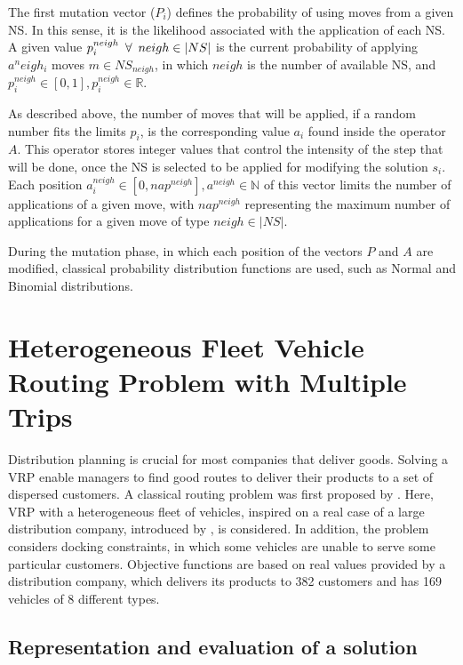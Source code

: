 \documentclass{endm}
\begin{document}
The first mutation vector ($P_i$) defines the probability of using moves from a given NS.
In this sense, it is the likelihood associated with the application of each NS.
A given value $p^{neigh}_i \enskip \forall \enskip neigh \in |NS|$ is the current probability of applying $a^neigh_i$ moves $m \in NS_{neigh}$, in which $neigh$ is the number of available NS, and $p^{neigh}_i \in [0,1], p^{neigh}_i \in \mathbb{R}$.

As described above, the number of moves that will be applied, if a random number fits the limits $p_i$, is the corresponding value $a_i$ found inside the operator $A$.
This operator stores integer values that control the intensity of the step that will be done, once the NS is selected to be applied for modifying the solution $s_i$.
Each position $a^{neigh}_i \in [0,nap^{neigh}], a^{neigh} \in \mathbb{N}$ of this vector limits the number of applications of a given move, with $nap^{neigh}$ representing the maximum number of applications for a given move of type ${neigh} \in |NS|$.

During the mutation phase, in which each position of the vectors $P$ and $A$ are modified, classical probability distribution functions are used, such as Normal and Binomial distributions.

\section{Heterogeneous Fleet Vehicle Routing Problem with Multiple Trips} \label{sec:HFVRP:HeuristicModel}

Distribution planning is crucial for most companies that deliver goods.
Solving a VRP enable managers to find good routes to deliver their products to a set of dispersed customers.
A classical routing problem was first proposed by \cite{dantzig59}.
Here, VRP with a heterogeneous fleet of vehicles, inspired on a real case of a large distribution company, introduced by \cite{Coelho2016}, is considered.
In addition, the problem considers docking constraints, in which some vehicles are unable to serve some particular customers.
Objective functions are based on real values provided by a distribution company,
which delivers its products to 382 customers and has 169 vehicles of 8 different types.

 
\subsection{Representation and evaluation of a solution} \label{subSec:HFVRP:SolRepresentation}
\end{document}
